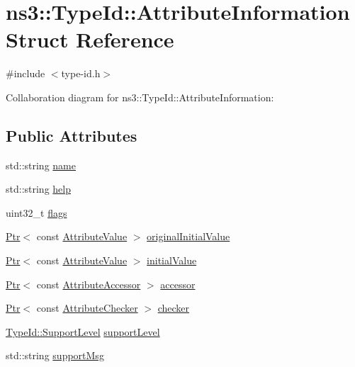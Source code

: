 \hypertarget{structns3_1_1TypeId_1_1AttributeInformation}{}\section{ns3\+:\+:Type\+Id\+:\+:Attribute\+Information Struct Reference}
\label{structns3_1_1TypeId_1_1AttributeInformation}


{\ttfamily \#include $<$type-\/id.\+h$>$}



Collaboration diagram for ns3\+:\+:Type\+Id\+:\+:Attribute\+Information\+:
\subsection*{Public Attributes}
\begin{DoxyCompactItemize}
\item 
std\+::string \hyperlink{structns3_1_1TypeId_1_1AttributeInformation_a24a42e783f06cd5b89ae8bbe729e482b}{name}
\item 
std\+::string \hyperlink{structns3_1_1TypeId_1_1AttributeInformation_ae65f436160b91c8c2d08b04663b24a3e}{help}
\item 
uint32\+\_\+t \hyperlink{structns3_1_1TypeId_1_1AttributeInformation_a8ed109175990dcc554ac3ea28777c1a7}{flags}
\item 
\hyperlink{classns3_1_1Ptr}{Ptr}$<$ const \hyperlink{classns3_1_1AttributeValue}{Attribute\+Value} $>$ \hyperlink{structns3_1_1TypeId_1_1AttributeInformation_a15ed13f2a95e9205ebb362e5bcb71db6}{original\+Initial\+Value}
\item 
\hyperlink{classns3_1_1Ptr}{Ptr}$<$ const \hyperlink{classns3_1_1AttributeValue}{Attribute\+Value} $>$ \hyperlink{structns3_1_1TypeId_1_1AttributeInformation_acd0766dbece64deff76f92fab61396e4}{initial\+Value}
\item 
\hyperlink{classns3_1_1Ptr}{Ptr}$<$ const \hyperlink{classns3_1_1AttributeAccessor}{Attribute\+Accessor} $>$ \hyperlink{structns3_1_1TypeId_1_1AttributeInformation_a4e1df8b7376d325b24087148639351d6}{accessor}
\item 
\hyperlink{classns3_1_1Ptr}{Ptr}$<$ const \hyperlink{classns3_1_1AttributeChecker}{Attribute\+Checker} $>$ \hyperlink{structns3_1_1TypeId_1_1AttributeInformation_a9c88fa5f03a9fa44ca593a1320f90412}{checker}
\item 
\hyperlink{classns3_1_1TypeId_ad55d31e57490a83a3ededa096a8d2588}{Type\+Id\+::\+Support\+Level} \hyperlink{structns3_1_1TypeId_1_1AttributeInformation_a16c5c0bf1ebdd7cc6956c2d3a1974f87}{support\+Level}
\item 
std\+::string \hyperlink{structns3_1_1TypeId_1_1AttributeInformation_acb7596553a8f62a053b097b99e9a1d4b}{support\+Msg}
\end{DoxyCompactItemize}


